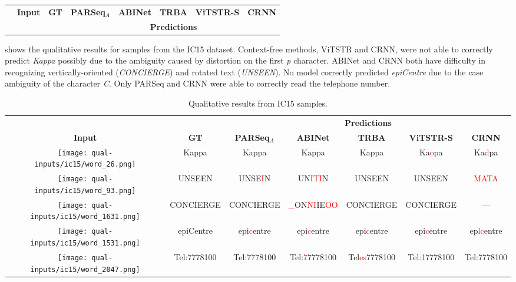 \begin{table*}[htbp]
\begin{tabular}{ c c c c c c c c }
    & \textbf{Input} & \textbf{GT} & \textbf{PARSeq$_A$} & \textbf{ABINet} & \textbf{TRBA} & \textbf{ViTSTR-S} & \textbf{CRNN} \\
    \cmidrule{4-8}
    & & & \multicolumn{5}{c}{\textbf{Predictions}} \\
    
    \bottomrule
  \end{tabular}
  \label{tab:qual-results-regular}
\end{table*}

 shows the qualitative results for samples from the IC15 dataset. Context-free methods, ViTSTR and CRNN, were not able to correctly predict \textit{Kappa} possibly due to the ambiguity caused by distortion on the first \textit{p} character. ABINet and CRNN both have difficulty in recognizing vertically-oriented (\textit{CONCIERGE}) and rotated text (\textit{UNSEEN}). No model correctly predicted \textit{epiCentre} due to the case ambiguity of the character \textit{C}. Only PARSeq and CRNN were able to correctly read the telephone number.

\begin{table*}[htbp]
  \scriptsize
  \centering
  \setlength\tabcolsep{2pt}
  \caption{Qualitative results from IC15 samples.}
  \begin{tabular}{ c c c c c c c }
    \toprule
    & & \multicolumn{5}{c}{\textbf{Predictions}} \\
    \cmidrule{3-7}
    \textbf{Input} & \textbf{GT} & \textbf{PARSeq$_A$} & \textbf{ABINet} & \textbf{TRBA} & \textbf{ViTSTR-S} & \textbf{CRNN} \\
    \midrule
    \texttt{[image: qual-inputs/ic15/word\_26.png]} & Kappa & Kappa & Kappa & Kappa & Ka\textcolor{red}{o}pa & Ka\textcolor{red}{d}pa \\
    \texttt{[image: qual-inputs/ic15/word\_93.png]} & UNSEEN & UNSE\textcolor{red}{I}N & UN\textcolor{red}{ITI}N & UNSEEN & UNSEEN & \textcolor{red}{MATA} \\
    \texttt{[image: qual-inputs/ic15/word\_1631.png]} & CONCIERGE & CONCIERGE & \textcolor{red}{\_}ON\textcolor{red}{NI}IE\textcolor{red}{OO} & CONCIERGE & CONCIERGE & \textcolor{red}{---} \\
    \texttt{[image: qual-inputs/ic15/word\_1531.png]} & epiCentre & epi\textcolor{red}{c}entre & epi\textcolor{red}{c}entre & epi\textcolor{red}{c}entre & epi\textcolor{red}{c}entre & ep\textcolor{red}{lc}entre \\
    \texttt{[image: qual-inputs/ic15/word\_2047.png]} & Tel:7778100 & Tel:7778100 & Tel:\textcolor{red}{7}7778100 & Tel\textcolor{red}{es}7778100 & Tel:\textcolor{red}{1}7778100 & Tel:7778100 \\
    \bottomrule
  \end{tabular}
  \label{tab:qual-results-ic15}
\end{table*}

